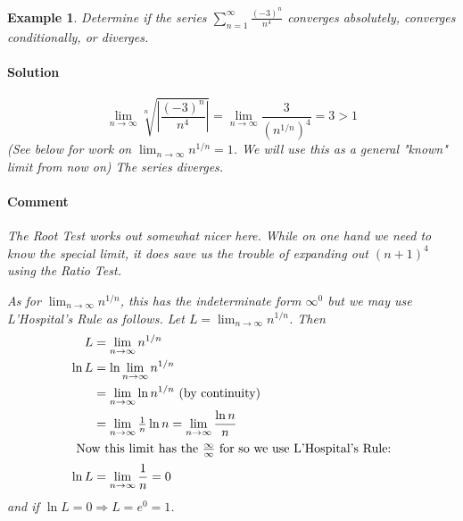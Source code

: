\documentclass[letterpaper, 11pt, openany]{book}
\theoremstyle{mytheoremstyle}
\theoremstyle{myexamplestyle}
\newtheorem{example}{Example}[section]
\newenvironment{solution}{\paragraph{\sffamily \smaller \fontseries{b}\selectfont Solution}}{\hfill\faSquare}
\newenvironment{commentary}{\paragraph{\sffamily \smaller \fontseries{b}\selectfont Comment}}{}
\begin{document}
\begin{example}\label{e:roottestindetpower}
    Determine if the series $\displaystyle \sum_{n=1}^{\infty} \frac{(-3)^{n}}{n^{4}}$ converges absolutely, converges conditionally, or diverges.
    \begin{solution}
        \[\lim_{n \to \infty} \sqrt[n]{\left| \frac{(-3)^{n}}{n^{4}} \right|} = \lim_{n \to \infty} \frac{3}{(n^{1/n})^{4}} = 3 > 1\]
        (See below for work on $\displaystyle \lim_{n \to \infty} n^{1/n} = 1$. We will use this as a general "known" limit from now on) The series diverges.
    \end{solution}
    \begin{commentary}
        The Root Test works out somewhat nicer here. While on one hand we need to know the special limit, it does save us the trouble of expanding out $(n+1)^{4}$ using the Ratio Test.

        As for $\displaystyle \lim_{n \to \infty} n^{1/n}$, this has the indeterminate form $\infty^{0}$ but we may use L'Hospital's Rule as follows. Let $L = \lim_{n \to \infty} n^{1/n}$. Then
        \begin{align*}
            L       &= \lim_{n \to \infty} n^{1/n} \\
            \ln L   &= \ln \lim_{n \to \infty} n^{1/n}\\
                    &= \lim_{n \to \infty} \ln n^{1/n} \text { (by continuity)}\\
                    &= \lim_{n \to \infty} \tfrac{1}{n}\ln n = \lim_{n \to \infty} \frac{\ln n}{n}\\
            \intertext{ Now this limit has the $\frac{\infty}{\infty}$ for so we use L'Hospital's Rule:}
            \ln L   &= \lim_{n \to \infty} \frac{1}{n} = 0\\
        \end{align*}
        and if $\ln L = 0 \Rightarrow L = e^{0} = 1$.
    \end{commentary}    
\end{example}
\end{document}
